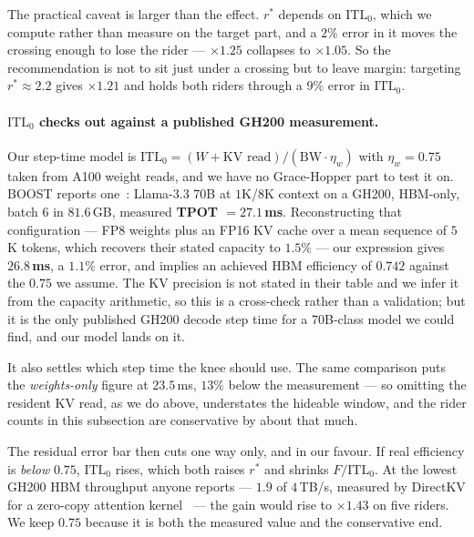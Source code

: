 The practical caveat is larger than the effect. $r^{*}$ depends on
$\mathrm{ITL}_0$, which we compute rather than measure on the target part, and a
$2\%$ error in it moves the crossing enough to lose the rider --- $\times 1.25$
collapses to $\times 1.05$. So the recommendation is not to sit just under a
crossing but to leave margin: targeting $r^{*} \approx 2.2$ gives $\times 1.21$ and
holds both riders through a $9\%$ error in $\mathrm{ITL}_0$.

\paragraph{$\mathrm{ITL}_0$ checks out against a published GH200 measurement.}
Our step-time model is $\mathrm{ITL}_0 = (W + \text{KV read})/(\mathrm{BW} \cdot
\eta_w)$ with $\eta_w = 0.75$ taken from A100 weight reads, and we have no
Grace-Hopper part to test it on. BOOST reports one~\cite{boost}: Llama-3.3 70B at
$1$K/$8$K context on a GH200, HBM-only, batch $6$ in $81.6$\,GB, measured
\textbf{TPOT $= 27.1$\,ms}. Reconstructing that configuration --- FP8 weights plus
an FP16 KV cache over a mean sequence of $5$K tokens, which recovers their stated
capacity to $1.5\%$ --- our expression gives $\mathbf{26.8}$\,\textbf{ms}, a
$1.1\%$ error, and implies an achieved HBM efficiency of $0.742$ against the
$0.75$ we assume. The KV precision is not stated in their table and we infer it
from the capacity arithmetic, so this is a cross-check rather than a validation;
but it is the only published GH200 decode step time for a 70B-class model we could
find, and our model lands on it.

It also settles which step time the knee should use. The same comparison puts the
\emph{weights-only} figure at $23.5$\,ms, $13\%$ below the measurement --- so
omitting the resident KV read, as we do above, understates the hideable window, and
the rider counts in this subsection are conservative by about that much.

The residual error bar then cuts one way only, and in our favour. If real
efficiency is \emph{below} $0.75$, $\mathrm{ITL}_0$ rises, which both raises $r^{*}$
and shrinks $F/\mathrm{ITL}_0$. At the lowest GH200 HBM throughput anyone reports
--- $1.9$ of $4$\,TB/s, measured by DirectKV for a zero-copy attention
kernel~\cite{directkv} --- the gain would rise to $\times 1.43$ on five riders. We
keep $0.75$ because it is both the measured value and the conservative end.

